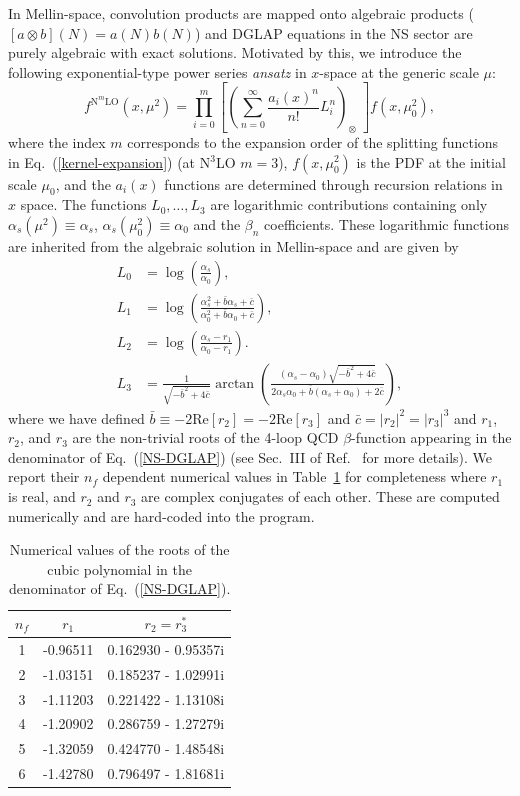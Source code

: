 \documentclass[preprint,12pt]{elsarticle}
\begin{document}
In Mellin-space, convolution products are mapped onto algebraic products ($[a\otimes b](N)=a(N)b(N)$) and DGLAP equations in the NS sector are purely algebraic with exact solutions. Motivated by this, we introduce the following exponential-type power series {\it ansatz} in $x$-space at the generic scale $\mu$:
%
\begin{equation}
f^{\mathrm{N}^m\mathrm{LO}}(x,\mu^2) =
\prod_{i=0}^m \left[
\left(\sum_{n=0}^\infty \frac{a_i(x)^n}{n!}L_i^n\right)_{\otimes}
\;
\right]
f(x,\mu_0^2),
\label{x-ansatz}
\end{equation}
where the index $m$ corresponds to the expansion order of the splitting functions in Eq.~(\ref{kernel-expansion}) (at N$^3$LO $m=3$), $f(x,\mu_0^2)$ is the PDF at the initial scale $\mu_0$, and the $a_i(x)$ functions are determined through recursion relations in $x$ space. The functions $L_0,\dots, L_3$ are logarithmic contributions containing only $\alpha_s(\mu^2)\equiv\alpha_s$, $\alpha_s(\mu_0^2)\equiv\alpha_0$ and the $\beta_n$ coefficients. These logarithmic functions are inherited from the algebraic solution in Mellin-space and are given by 
%
\begin{align}
L_0 &= \log \left(\frac{\alpha_s}{\alpha_0}\right), 
\\
L_1 &= \log \left(\frac{\alpha_s^2 + \bar{b}\alpha_s + \bar{c}}{\alpha_0^2 + \bar{b}\alpha_0 + \bar{c}}\right), 
\\
L_2 &= \log \left(\frac{\alpha_s - r_1}{\alpha_0 - r_1}\right). 
\\
L_3 &= \frac{1}{\sqrt{-\bar{b}^2+4\bar{c}}}\arctan\left( \frac{(\alpha_s - \alpha_0)\sqrt{-\bar{b}^2+4\bar{c}}}{2\alpha_s\alpha_0 + \bar{b}(\alpha_s+\alpha_0) + 2\bar{c}} \right),
\end{align}
%
where we have defined $\bar{b} \equiv -2\mathrm{Re}[r_2] = -2\mathrm{Re}[r_3]$ and $\bar{c} = |r_2|^2 = |r_3|^3$ and $r_1$, $r_2$, and $r_3$ are the non-trivial roots of the 4-loop QCD $\beta$-function appearing in the denominator of Eq.~(\ref{NS-DGLAP}) (see Sec.~III of Ref.~\cite{Hampson:2025pvi} for more details). We report their $n_f$ dependent numerical values in Table~\ref{n3lo-roots} for completeness where $r_1$ is real, and $r_2$ and $r_3$ are complex conjugates of each other. These are computed numerically and are hard-coded into the program.
%
\begin{table}[ht]
\centering
\begin{tabular}{|c|c|c|}
\hline
$n_f$ & $r_1$ & $r_2 = r_3^*$ \\ \hline
1 & -0.96511 & 0.162930 - 0.95357i \\ \hline
2 & -1.03151 & 0.185237 - 1.02991i \\ \hline
3 & -1.11203 & 0.221422 - 1.13108i \\ \hline
4 & -1.20902 & 0.286759 - 1.27279i \\ \hline
5 & -1.32059 & 0.424770 - 1.48548i \\ \hline
6 & -1.42780 & 0.796497 - 1.81681i \\ \hline
\end{tabular}
\caption{Numerical values of the roots of the cubic polynomial in the denominator of Eq.~(\ref{NS-DGLAP}).}
\label{n3lo-roots}
\end{table}
\end{document}
